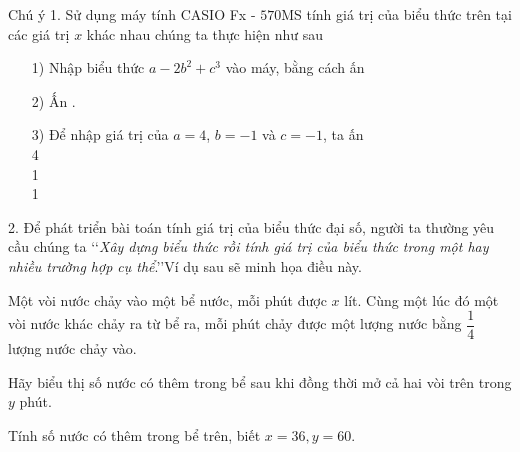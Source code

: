\begin{note}{Chú ý}
	1. Sử dụng máy tính CASIO Fx - $570$MS tính giá trị của biểu thức trên tại các giá trị $x$ khác nhau chúng ta thực hiện như sau
	\begin{itemize}
		\item[1)] Nhập biểu thức $a-2b^2+c^3$ vào máy, bằng cách ấn
		\begin{center}
			  \fbox{$-$}     \fbox{$+$}     
		\end{center}
		\item[2)] Ấn  .
		\item[3)] Để nhập giá trị của  $a=4$, $b=-1$ và $c=-1$, ta ấn \\
		4 \fbox{=}	\qquad \qquad \qquad\qquad \qquad \fbox{B?\qquad 1}\\
		\fbox{$(-)$} 1 \fbox{=} \qquad \qquad \qquad $~~~$ \\
		\fbox{$(-)$} 1 \fbox{=} \qquad \qquad \qquad $~~~$ 
	\end{itemize}
2. Để phát triển bài toán tính giá trị của biểu thức đại số, người ta thường yêu cầu chúng ta \lq\lq\textit{Xây dựng biểu thức rồi tính giá trị của biểu thức trong một hay nhiều trường hợp cụ thể}.\rq\rq Ví dụ sau sẽ minh họa điều này.
\end{note}

\begin{vd}%
Một vòi nước chảy vào một bể nước, mỗi phút được $x$ lít. Cùng một lúc đó một vòi nước khác chảy ra từ bể ra, mỗi phút chảy được một lượng nước bằng $\dfrac{1}{4}$ lượng nước chảy vào.
\begin{enumEX}{1}
	\item Hãy biểu thị số nước có thêm trong bể sau khi đồng thời mở cả hai vòi trên trong $y$ phút.
	\item Tính số nước có thêm trong bể trên, biết $x=36, y=60$.
\end{enumEX}
\end{vd}

